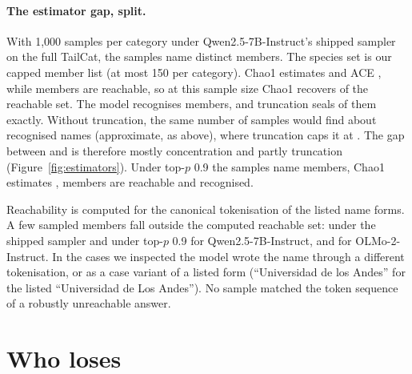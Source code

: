 \documentclass[11pt]{article}
\begin{document}
\paragraph{The estimator gap, split.} With 1{,}000 samples per category under Qwen2.5-7B-Instruct's shipped sampler on the full TailCat, the samples name \peQwenShippedSobs{} distinct members. The species set is our capped member list (at most 150 per category). Chao1 estimates \peQwenShippedChao{} and ACE \peQwenShippedAce{}, while \peQwenShippedReach{} members are reachable, so at this sample size Chao1 recovers \peQwenShippedChaoShare{} of the reachable set. The model recognises \peQwenShippedRecog{} members, and truncation seals \peQwenShippedTrunc{} of them exactly. Without truncation, the same number of samples would find about \ztShipUntrKQI{} recognised names (approximate, as above), where truncation caps it at \ztShipPlateauQI{}. The gap between \peQwenShippedChao{} and \peQwenShippedRecog{} is therefore mostly concentration and partly truncation (Figure~\ref{fig:estimators}). Under top-$p$ 0.9 the samples name \peQwenPnineSobs{} members, Chao1 estimates \peQwenPnineChao{}, \peQwenPnineReach{} members are reachable and \peQwenPnineRecog{} recognised.

Reachability is computed for the canonical tokenisation of the listed name forms. A few sampled members fall outside the computed reachable set: \peQwenShippedOutside{} under the shipped sampler and \peQwenPnineOutside{} under top-$p$ 0.9 for Qwen2.5-7B-Instruct, and \peOlmoPnineOutside{} for OLMo-2-Instruct. In the cases we inspected the model wrote the name through a different tokenisation, or as a case variant of a listed form (``Universidad de los Andes'' for the listed ``Universidad de Los Andes''). No sample matched the token sequence of a robustly unreachable answer.



\section{Who loses}\label{sec:who}
\end{document}
